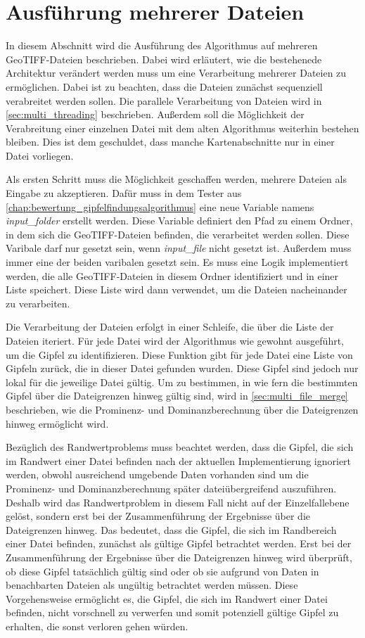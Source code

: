 \section{Ausführung mehrerer Dateien} \label{sec:multi_file_execution}
In diesem Abschnitt wird die Ausführung des Algorithmus auf mehreren GeoTIFF-Dateien beschrieben. Dabei wird erläutert, wie die bestehenede Architektur verändert werden muss um eine Verarbeitung mehrerer Dateien zu ermöglichen. Dabei ist zu beachten, dass die Dateien zunächst sequenziell verabreitet werden sollen. Die parallele Verarbeitung von Dateien wird in \ref{sec:multi_threading} beschrieben. Außerdem soll die Möglichkeit der Verabreitung einer einzelnen Datei mit dem alten Algorithmus weiterhin bestehen bleiben. Dies ist dem geschuldet, dass manche Kartenabschnitte nur in einer Datei vorliegen. 

Als ersten Schritt muss die Möglichkeit geschaffen werden, mehrere Dateien als Eingabe zu akzeptieren. Dafür muss in dem Tester aus \ref{chap:bewertung_gipfelfindungsalgorithmus} eine neue Variable namens \textit{input\_folder} erstellt werden. Diese Variable definiert den Pfad zu einem Ordner, in dem sich die GeoTIFF-Dateien befinden, die verarbeitet werden sollen. Diese Varibale darf nur gesetzt sein, wenn \textit{input\_file} nicht gesetzt ist. Außerdem muss immer eine der beiden varibalen gesetzt sein. Es muss eine Logik implementiert werden, die alle GeoTIFF-Dateien in diesem Ordner identifiziert und in einer Liste speichert. Diese Liste wird dann verwendet, um die Dateien nacheinander zu verarbeiten.

Die Verarbeitung der Dateien erfolgt in einer Schleife, die über die Liste der Dateien iteriert. Für jede Datei wird der Algorithmus wie gewohnt ausgeführt, um die Gipfel zu identifizieren. Diese Funktion gibt für jede Datei eine Liste von Gipfeln zurück, die in dieser Datei gefunden wurden. Diese Gipfel sind jedoch nur lokal für die jeweilige Datei gültig. Um zu bestimmen, in wie fern die bestimmten Gipfel über die Dateigrenzen hinweg gültig sind, wird in \ref{sec:multi_file_merge} beschrieben, wie die Prominenz- und Dominanzberechnung über die Dateigrenzen hinweg ermöglicht wird.

Bezüglich des Randwertproblems muss beachtet werden, dass die Gipfel, die sich im Randwert einer Datei befinden nach der aktuellen Implementierung ignoriert werden, obwohl ausreichend umgebende Daten vorhanden sind um die Prominenz- und Dominanzberechnung später dateiübergreifend auszuführen. Deshalb wird das Randwertproblem in diesem Fall nicht auf der Einzelfallebene gelöst, sondern erst bei der Zusammenführung der Ergebnisse über die Dateigrenzen hinweg. Das bedeutet, dass die Gipfel, die sich im Randbereich einer Datei befinden, zunächst als gültige Gipfel betrachtet werden. Erst bei der Zusammenführung der Ergebnisse über die Dateigrenzen hinweg wird überprüft, ob diese Gipfel tatsächlich gültig sind oder ob sie aufgrund von Daten in benachbarten Dateien als ungültig betrachtet werden müssen. Diese Vorgehensweise ermöglicht es, die Gipfel, die sich im Randwert einer Datei befinden, nicht vorschnell zu verwerfen und somit potenziell gültige Gipfel zu erhalten, die sonst verloren gehen würden. 

